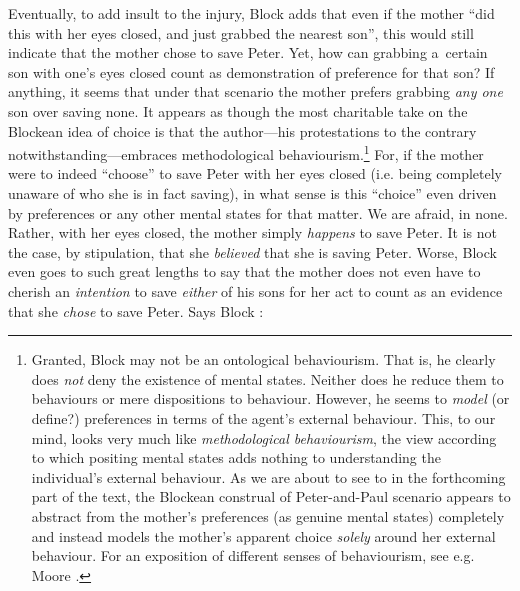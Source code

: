 Eventually, to add insult to the injury, Block 
\parencite*[][p.51]{block_response_2022} %
 adds that even if the mother ``did this with her eyes closed, and just grabbed the nearest son'', this would still indicate that the mother chose to save Peter. Yet, how can grabbing a~certain son with one's eyes closed count as demonstration of preference for that son? If anything, it seems that under that scenario the mother prefers grabbing \textit{any one} son over saving none. It appears as though the most charitable take on the Blockean idea of choice is that the author---his protestations to the contrary notwithstanding---embraces methodological behaviourism.\footnote{Granted, Block may not be an ontological behaviourism. That is, he clearly does \textit{not} deny the existence of mental states. Neither does he reduce them to behaviours or mere dispositions to behaviour. However, he seems to \textit{model} (or define?) preferences in terms of the agent's external behaviour. 
\parencite[][pp.54–55]{block_response_2022}%
This, to our mind, looks very much like \textit{methodological behaviourism}, the view according to which positing mental states adds nothing to understanding the individual's external behaviour. As we are about to see to in the forthcoming part of the text, the Blockean construal of Peter-and-Paul scenario appears to abstract from the mother's preferences (as genuine mental states) completely and instead models the mother's apparent choice \textit{solely} around her external behaviour. For an exposition of different senses of behaviourism, see e.g. Moore 
\parencite*[][]{moore_distinguishing_2001}. %
 } For, if the mother were to indeed ``choose'' to save Peter with her eyes closed (i.e. being completely unaware of who she is in fact saving), in what sense is this ``choice'' even driven by preferences or any other mental states for that matter. We are afraid, in none. Rather, with her eyes closed, the mother simply \textit{happens} to save Peter. It is not the case, by stipulation, that she \textit{believed} that she is saving Peter. Worse, Block even goes to such great lengths to say that the mother does not even have to cherish an \textit{intention} to save \textit{either} of his sons for her act to count as an evidence that she \textit{chose} to save Peter. Says Block 
\parencite*[][pp.54–55]{block_response_2022}:%




